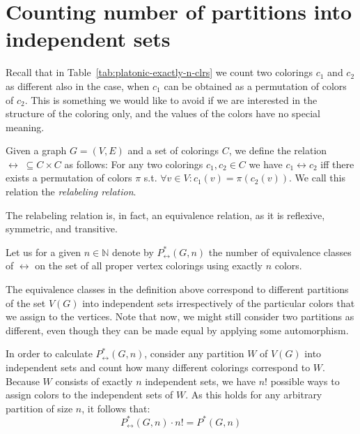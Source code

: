 \chapter{Counting number of partitions into independent sets}
\label{chap:num-partitions-into-indep-sets}

Recall that in Table~\ref{tab:platonic-exactly-n-clrs} we count two colorings $c_1$ and $c_2$ as different also in the case, when $c_1$ can be obtained as a permutation of colors of $c_2$. This is something we would like to avoid if we are interested in the structure of the coloring only, and the values of the colors have no special meaning.

\begin{defn}\label{dfn:relabeling-relation}
    Given a graph $G=(V,E)$ and a set of colorings $C$, we define the relation $\leftrightarrow \; \subseteq C \times C$ as follows: For any two colorings $c_1,c_2 \in C$ we have $c_1 \leftrightarrow c_2$ iff there exists a permutation of colors $\pi$ s.t. $\forall v \in V : c_1(v) = \pi(c_2(v))$. We call this relation the \emph{relabeling relation}.
\end{defn}

The relabeling relation is, in fact, an equivalence relation, as it is reflexive, symmetric, and transitive.

\begin{defn}
    Let us for a given $n \in \mathbb{N}$ denote by $P^*_{\leftrightarrow}(G,n)$ the number of equivalence classes of $\leftrightarrow$ on the set of all proper vertex colorings using exactly $n$ colors. 
\end{defn}

The equivalence classes in the definition above correspond to different partitions of the set $V(G)$ into independent sets irrespectively of the particular colors that we assign to the vertices. Note that now, we might still consider two partitions as different, even though they can be made equal by applying some automorphism.

In order to calculate $P^*_{\leftrightarrow}(G,n)$, consider any partition $W$ of $V(G)$ into independent sets and count how many different colorings correspond to $W$. Because $W$ consists of exactly $n$ independent sets, we have $n!$ possible ways to assign colors to the independent sets of $W$. As this holds for any arbitrary partition of size $n$, it follows that:
\begin{equation}\label{eqn:count-relabel-orbits}
    P^*_{\leftrightarrow}(G,n) \cdot n! = P^*(G,n)
\end{equation}

